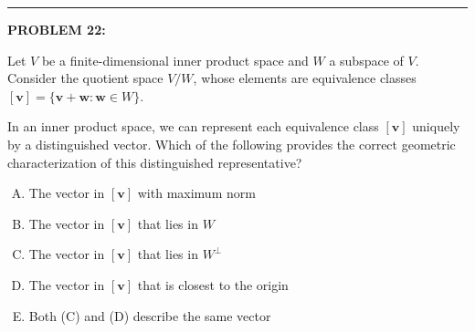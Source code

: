 \documentclass[12pt]{amsart}
\newcommand{\divider}{
  \vspace{-1em} %
  \noindent
  \raisebox{-0.15ex}{\textbullet}%
  \hspace{0.5em}%
  \rule[0.5ex]{0.95\textwidth}{1.0pt}%
  \hspace{0.5em}%
  \raisebox{-0.15ex}{\textbullet}%
  \vspace{0em} %
}
\begin{document}

\divider
\newpage

{\bf PROBLEM 22:}

Let $V$ be a finite-dimensional inner product space and $W$ a subspace of $V$. Consider the quotient space $V/W$, whose elements are equivalence classes $[\mathbf{v}] = \{\mathbf{v} + \mathbf{w} : \mathbf{w} \in W\}$.

In an inner product space, we can represent each equivalence class $[\mathbf{v}]$ uniquely by a distinguished vector. Which of the following provides the correct geometric characterization of this distinguished representative?

\begin{enumerate}[(A)]
\item The vector in $[\mathbf{v}]$ with maximum norm
\item The vector in $[\mathbf{v}]$ that lies in $W$
\item The vector in $[\mathbf{v}]$ that lies in $W^{\perp}$
\item The vector in $[\mathbf{v}]$ that is closest to the origin
\item Both (C) and (D) describe the same vector
\end{enumerate}
\end{document}
